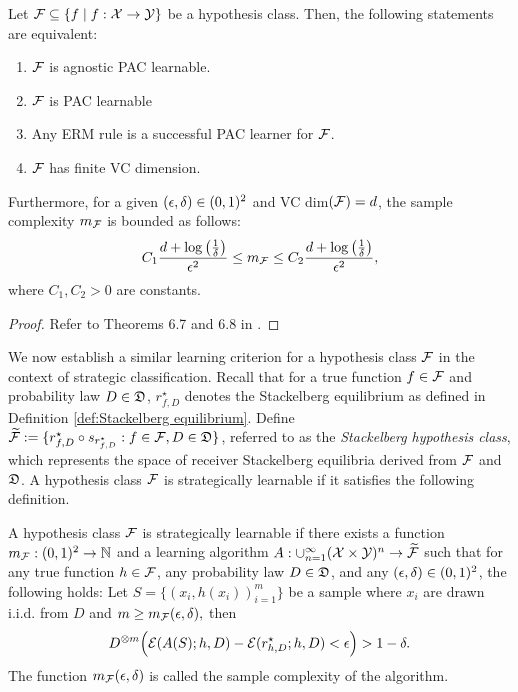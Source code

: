 \begin{thm}\label{thm:Fundamental theorem of statistical learning}
Let  $\mathcal{F} \subseteq \{f \mid f:\mathcal{X} \rightarrow \mathcal{Y}\}$ be a hypothesis class. Then, the following statements are equivalent:

\begin{enumerate}[label=\alph*)]
    \item $\mathcal{F}$ is agnostic PAC learnable.
    \item $\mathcal{F}$ is PAC learnable
    \item Any ERM rule is a successful PAC learner for $\mathcal{F}$.
    \item $\mathcal{F}$ has finite VC dimension.
\end{enumerate}
Furthermore, for a given $(\epsilon,\delta) \in (0,1)^2$ and  VC dim$(\mathcal{F}) = d$, the sample complexity $m_{\mathcal{F}}$ is bounded as follows:
\begin{equation}\label{eqn:sample complexity:thm:Fundamental theorem of statistical learning}
C_1\frac{d + \log\left(\frac{1}{\delta}\right)}{\epsilon^2} \leq m_{\mathcal{F}} \leq C_2\frac{d + \log\left(\frac{1}{\delta}\right)}{\epsilon^2},
\end{equation}
where $C_1, C_2 > 0$ are constants.
\end{thm}

\begin{proof}
Refer to Theorems 6.7 and 6.8 in \cite{shalev-shwartz_ben-david_2014}.
\end{proof}

We now establish a similar learning criterion for a hypothesis class $\mathcal{F}$ in the context of strategic classification. Recall that for a true function $f \in \mathcal{F}$ and probability law $D \in \mathfrak{D}$, $r^\star_{f,D}$ denotes the Stackelberg equilibrium as defined in Definition \ref{def:Stackelberg equilibrium}. Define $\widetilde{\mathcal{F}} := \{r^\star_{f,D} \circ s_{r^\star_{f,D}} : f \in \mathcal{F}, D \in \mathfrak{D}\}$, referred to as the \emph{Stackelberg hypothesis class}, which represents the space of receiver Stackelberg equilibria derived from $\mathcal{F}$ and $\mathfrak{D}$. A hypothesis class $\mathcal{F}$ is strategically learnable if it satisfies the following definition.

\begin{defn}\label{def:Strategically learnable class}
A hypothesis class $\mathcal{F}$ is strategically learnable if there exists a function $m_{\mathcal{F}}: (0,1)^2 \to \mathbb{N}$ and a learning algorithm $A: \cup_{n=1}^\infty (\mathcal{X} \times \mathcal{Y})^n \to \widetilde{\mathcal{F}}$ such that for any true function $h \in \mathcal{F}$, any probability law $D \in \mathfrak{D}$, and any $(\epsilon, \delta) \in (0,1)^2$, the following holds: Let $S = \{(x_i, h(x_i))_{i=1}^m\}$ be a sample where $x_i$ are drawn i.i.d. from $D$ and $m \geq m_{\mathcal{F}}(\epsilon, \delta),$
then
\begin{equation}\label{def: strategically learnable}
D^{\otimes m}\Big( \mathcal{E}(A(S); h, D) - \mathcal{E}(r^\star_{h, D}; h, D) < \epsilon \Big) > 1 - \delta.
\end{equation}
The function $m_{\mathcal{F}}(\epsilon, \delta)$ is called the sample complexity of the algorithm.
\end{defn}


